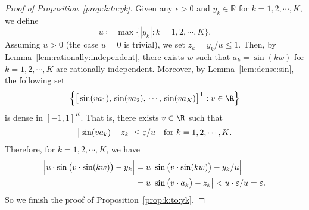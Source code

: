 \documentclass[11pt,a4paper]{article}
\begin{document}
\begin{proof}[Proof of Proposition~\ref{prop:k:to:yk}]
Given any \(\epsilon > 0\) and \(y_k \in \mathbb{R}\) for \(k = 1, 2, \cdots, K\), we define
\begin{equation*}
    u \coloneqq \max\big\{|y_k| : k = 1, 2, \cdots, K\big\}.
\end{equation*}
Assuming \(u > 0\) (the case \(u = 0\) is trivial), we set \(z_k = y_k / u \leq 1\). Then, by Lemma~\ref{lem:rationally:independent}, there exists \(w\) such that 
\(a_k = \sin(k w)\) for \(k = 1, 2, \cdots, K\) are rationally independent.
Moreover, by Lemma~\ref{lem:dense:sin}, 
the following set 
\begin{equation*}
    \Big\{\big[\sin(va_1),\, \sin(va_2),\, \cdots,\,\sin(va_K)\big]^\ts : v\in\R
    \Big\}
\end{equation*}
is dense in $[-1,1]^K$.
That is, there exists $v\in\R$ such that
\begin{equation*}
    \big|\sin(v a_k)-z_k\big|\le \varepsilon/u \quad \textnormal{for $k=1,2,\mathinner{\mkern-0.1mu\cdotp\mkern-0.3mu\cdotp\mkern-0.3mu\cdotp\mkern-0.1mu},K$.}
\end{equation*}
Therefore, for $k=1,2,\cdots,K$, we have
\begin{equation*}
\begin{split}
    \Big|u\cdot \sin\big(v \cdot \sin(kw)\big)-y_k\Big|
    &= u\Big| \sin\big(v \cdot \sin(kw)\big)-y_k/u\Big|\\
    &= u\big| \sin\big(v \cdot a_k\big)-z_k\big|
    <u\cdot \varepsilon/u = \varepsilon.
\end{split}
\end{equation*}
So we finish the proof of Proposition~\ref{prop:k:to:yk}.
\end{proof}
\end{document}
